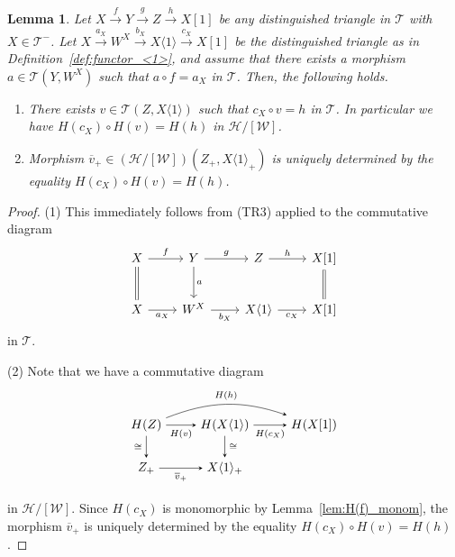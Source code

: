\documentclass[a4paper,reqno,10pt]{amsart}
\DeclareRobustCommand{\darkblueedit}[1]{#1}
\newtheorem{lemma}[lemma]{Lemma}
\theoremstyle{definition}
\theoremstyle{definition}
\theoremstyle{definition}
\theoremstyle{definition}
\theoremstyle{plain}
\newcommand{\CH}{\mathcal{H}}
\newcommand{\CT}{\mathcal{T}}
\newcommand{\CW}{\mathcal{W}}
\begin{document}
\begin{lemma}\label{lem:for_right_triangle_replace}
Let $X\xrightarrow{f}Y\xrightarrow{g}Z\xrightarrow{h}X[1]$ be any distinguished triangle in $\CT$ with $X\in\CT^-$.
Let
$X\xrightarrow{a_X}W^X\xrightarrow{b_X}X\langle 1\rangle\xrightarrow{c_X}X[1]$
be the distinguished triangle as in Definition~\ref{def:functor_<1>}, and assume that there exists \darkblueedit{a morphism} $a\in\CT(Y,W^X)$ such that $a\circ f=a_X$ in $\CT$.
Then, the following holds.
\begin{enumerate}
\item There exists $v\in\CT(Z,X\langle1\rangle)$ such that $c_X\circ v=h$ in $\CT$. 
In particular we have $H(c_X)\circ H(v)=H(h)$ in $\CH/[\CW]$. 
\item Morphism $\overline{v}_+\in(\CH/[\CW])(Z_+,X\langle1\rangle_+)$ is uniquely determined by the equality $H(c_X)\circ H(v)=H(h)$.
\end{enumerate}
\end{lemma}
\begin{proof}
{\rm (1)} This immediately follows from \darkblueedit{{\rm (TR3)}} applied to the commutative diagram
\[
\begin{tikzcd}[row sep=0.8cm, column sep=0.8cm]
X \arrow{r}{f}\arrow[d, equal]
&Y\arrow{d}{a} \arrow{r}{g}
&Z\arrow{r}{h} %
&X{[}1{]} \arrow[d, equal]
\\
X\arrow{r}[swap]{a_X}
&W^X\arrow{r}[swap]{b_X}
&X \langle1\rangle \arrow{r}[swap]{c_X}
&X{[}1{]}
\end{tikzcd}
\]
in $\CT$.

{\rm (2)} Note that we have a commutative diagram
\[
\begin{tikzpicture}[>=stealth]
\node (1) at (-2.2,0.6) {$H(Z)$};
\node (2) at (0,0.6) {$H(X\langle1\rangle)$};
\node (3) at (-2.2,-0.6) {$Z_+$};
\node (4) at (0,-0.6) {$X\langle1\rangle_+$};
\node (5) at (2.5,0.6) {$H(X[1])$};
\draw[->] (1) -- node[below,font=\scriptsize] {$H(v)$} (2);
\draw[->,bend left=20] (1) to node[above,font=\scriptsize] {$H(h)$} (5);
\draw[->] (1) -- node[left,font=\scriptsize] {$\cong$} (3);
\draw[->] (2) -- node[right,font=\scriptsize] {$\cong$} (4);
\draw[->] (3) -- node[below,font=\scriptsize] {$\overline{v}_+$} (4);
\draw[->] (2) -- node[below,font=\scriptsize] {$H(c_X)$} (5);
\end{tikzpicture}
\]
in $\CH/[\CW]$. Since $H(c_X)$ is monomorphic by Lemma~\ref{lem:H(f)_monom},
\darkblueedit{the morphism} $\overline{v}_+$
is uniquely determined by the equality $H(c_X)\circ H(v)=H(h)$.
\end{proof}
\end{document}
